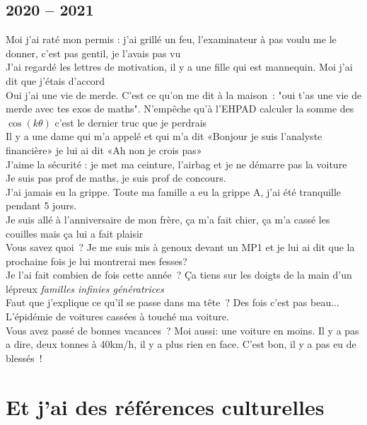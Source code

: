\documentclass[french, a4paper, openany]{book}
\begin{document}
	\subsection*{2020 -- 2021}
		\noindent \og Moi j'ai raté mon permis : j'ai grillé un feu, l'examinateur à pas voulu me le donner, c'est pas gentil, je l'avais pas vu \fg \\
		\og J'ai regardé les lettres de motivation, il y a une fille qui est mannequin. Moi j'ai dit que j'étais d'accord \fg \\
		\og Oui j'ai une vie de merde. C'est ce qu'on me dit à la maison~: "oui t'as une vie de merde avec tes exos de maths". N'empêche qu'à l'EHPAD calculer la somme des $\cos(k \theta)$ c'est le dernier truc que je perdrais \fg \\
		\og Il y a une dame qui m'a appelé et qui m'a dit «Bonjour je suis l'analyste financière» je lui ai dit «Ah non je crois pas» \fg \\
		\og J'aime la sécurité : je met ma ceinture, l'airbag et je ne démarre pas la voiture \fg \\
		\og Je suis pas prof de maths, je suis prof de concours. \fg \\
		\og J'ai jamais eu la grippe. Toute ma famille a eu la grippe A, j'ai été tranquille pendant 5 jours. \fg \\
		\og Je suis allé à l'anniversaire de mon frère, ça m'a fait chier, ça m'a cassé les couilles mais ça lui a fait plaisir \fg \\
		\og Vous savez quoi~? Je me suis mis à genoux devant un MP1 et je lui ai dit que la prochaine fois je lui montrerai mes fesses? \fg \\
		\og Je l'ai fait combien de fois cette année~? Ça tiens sur les doigts de la main d'un lépreux \fg \emph{familles infinies génératrices} \\
		\og Faut que j'explique ce qu'il se passe dans ma tête~? Des fois c'est pas beau... \fg \\
		\og L'épidémie de voitures cassées à touché ma voiture. \fg \\
		\og Vous avez passé de bonnes vacances~? Moi aussi: une voiture en moins. Il y a pas a dire, deux tonnes à 40km/h, il y a plus rien en face. C'est bon, il y a pas eu de blessés~! \fg \\
	
\section*{Et j'ai des références culturelles}
\end{document}

